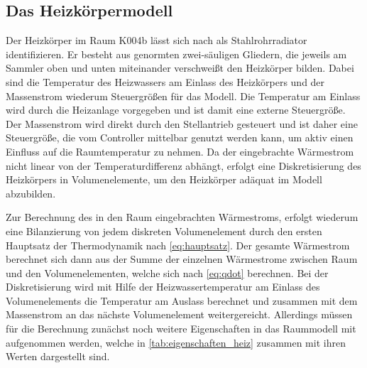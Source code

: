 \subsection{Das Heizkörpermodell}

Der Heizkörper im Raum K004b lässt sich nach \cite[S.~824f.]{re14} als Stahlrohrradiator identifizieren. Er besteht aus genormten zwei-säuligen Gliedern, die jeweils am Sammler oben und unten miteinander verschweißt den Heizkörper bilden. Dabei sind die Temperatur des Heizwassers am Einlass des Heizkörpers und der Massenstrom wiederum Steuergrößen für das Modell. Die Temperatur am Einlass wird durch die Heizanlage vorgegeben und ist damit eine externe Steuergröße. Der Massenstrom wird direkt durch den Stellantrieb gesteuert und ist daher eine Steuergröße, die vom Controller mittelbar genutzt werden kann, um aktiv einen Einfluss auf die Raumtemperatur zu nehmen. Da der eingebrachte Wärmestrom nicht linear von der Temperaturdifferenz abhängt, erfolgt eine Diskretisierung des Heizkörpers in Volumenelemente, um den Heizkörper adäquat im Modell abzubilden. 

Zur Berechnung des in den Raum eingebrachten Wärmestroms, erfolgt wiederum eine Bilanzierung von jedem diskreten Volumenelement durch den ersten Hauptsatz der Thermodynamik nach \ref{eq:hauptsatz}. Der gesamte Wärmestrom berechnet sich dann aus der Summe der einzelnen Wärmestrome zwischen Raum und den Volumenelementen, welche sich nach \ref{eq:qdot} berechnen. Bei der Diskretisierung wird mit Hilfe der Heizwassertemperatur am Einlass des Volumenelements die Temperatur am Auslass berechnet und zusammen mit dem Massenstrom an das nächste Volumenelement weitergereicht.
Allerdings müssen für die Berechnung zunächst noch weitere Eigenschaften in das Raummodell mit aufgenommen werden, welche in \ref{tab:eigenschaften_heiz} zusammen mit ihren Werten dargestellt sind.

